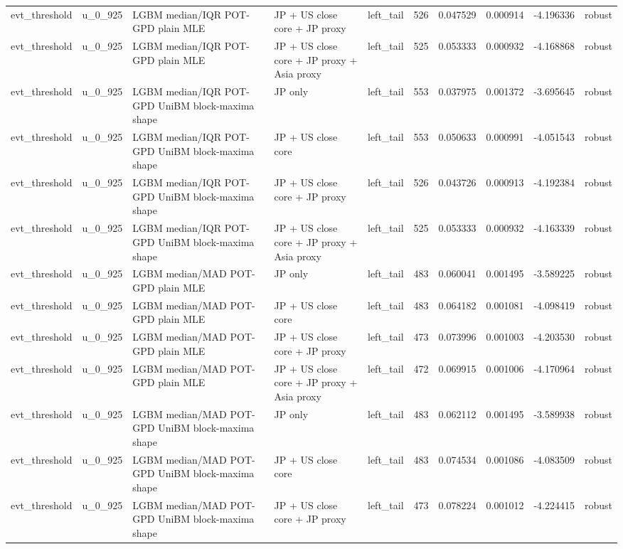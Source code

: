 \begin{tabular}{lll l lrrrrl}
evt\_threshold & u\_0\_925 & LGBM median/IQR POT-GPD plain MLE & JP + US close core + JP proxy & left\_tail & 526 & 0.047529 & 0.000914 & -4.196336 & robust \\
evt\_threshold & u\_0\_925 & LGBM median/IQR POT-GPD plain MLE & JP + US close core + JP proxy + Asia proxy & left\_tail & 525 & 0.053333 & 0.000932 & -4.168868 & robust \\
evt\_threshold & u\_0\_925 & LGBM median/IQR POT-GPD UniBM block-maxima shape & JP only & left\_tail & 553 & 0.037975 & 0.001372 & -3.695645 & robust \\
evt\_threshold & u\_0\_925 & LGBM median/IQR POT-GPD UniBM block-maxima shape & JP + US close core & left\_tail & 553 & 0.050633 & 0.000991 & -4.051543 & robust \\
evt\_threshold & u\_0\_925 & LGBM median/IQR POT-GPD UniBM block-maxima shape & JP + US close core + JP proxy & left\_tail & 526 & 0.043726 & 0.000913 & -4.192384 & robust \\
evt\_threshold & u\_0\_925 & LGBM median/IQR POT-GPD UniBM block-maxima shape & JP + US close core + JP proxy + Asia proxy & left\_tail & 525 & 0.053333 & 0.000932 & -4.163339 & robust \\
evt\_threshold & u\_0\_925 & LGBM median/MAD POT-GPD plain MLE & JP only & left\_tail & 483 & 0.060041 & 0.001495 & -3.589225 & robust \\
evt\_threshold & u\_0\_925 & LGBM median/MAD POT-GPD plain MLE & JP + US close core & left\_tail & 483 & 0.064182 & 0.001081 & -4.098419 & robust \\
evt\_threshold & u\_0\_925 & LGBM median/MAD POT-GPD plain MLE & JP + US close core + JP proxy & left\_tail & 473 & 0.073996 & 0.001003 & -4.203530 & robust \\
evt\_threshold & u\_0\_925 & LGBM median/MAD POT-GPD plain MLE & JP + US close core + JP proxy + Asia proxy & left\_tail & 472 & 0.069915 & 0.001006 & -4.170964 & robust \\
evt\_threshold & u\_0\_925 & LGBM median/MAD POT-GPD UniBM block-maxima shape & JP only & left\_tail & 483 & 0.062112 & 0.001495 & -3.589938 & robust \\
evt\_threshold & u\_0\_925 & LGBM median/MAD POT-GPD UniBM block-maxima shape & JP + US close core & left\_tail & 483 & 0.074534 & 0.001086 & -4.083509 & robust \\
evt\_threshold & u\_0\_925 & LGBM median/MAD POT-GPD UniBM block-maxima shape & JP + US close core + JP proxy & left\_tail & 473 & 0.078224 & 0.001012 & -4.224415 & robust \\

\end{tabular}
